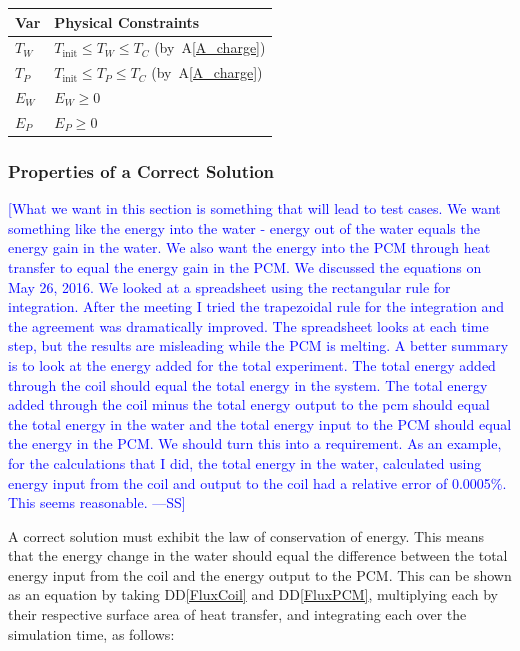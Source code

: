 \documentclass[12pt]{article}
\newcommand{\authornote}[3]{\textcolor{#1}{[#3 ---#2]}}
\newcommand{\authornote}[3]{}
\newcommand{\wss}[1]{\authornote{blue}{SS}{#1}}
\newcommand{\ddref}[1]{DD\ref{#1}}
\newcommand{\aref}[1]{A\ref{#1}}
\begin{document}
\begin{table}[!h]
\caption{Output Variables} \label{TblOutputVar}
\renewcommand{\arraystretch}{1.2}
\noindent \begin{longtable*}{l l} 
  \toprule
  \textbf{Var} & \textbf{Physical Constraints} \\
  \midrule 
  $T_W$ & $T_\text{init} \leq T_W \leq T_C$ (by~\aref{A_charge})
  \\
  $T_P$ & $T_\text{init} \leq T_P \leq T_C$ (by~\aref{A_charge})
  \\
  $E_W$ & $E_W \geq 0$
  \\
  $E_P$ & $E_P \geq 0$
  \\
  \bottomrule
\end{longtable*}
\end{table}

\subsubsection{Properties of a Correct Solution} \label{sec_CorrectSolution}

\wss{What we want in this section is something that will lead to test cases.  We
  want something like the energy into the water - energy out of the water equals
  the energy gain in the water.  We also want the energy into the PCM through
  heat transfer to equal the energy gain in the PCM.  We discussed the equations
  on May 26, 2016.  We looked at a spreadsheet using the rectangular rule for
  integration.  After the meeting I tried the trapezoidal rule for the
  integration and the agreement was dramatically improved.  The spreadsheet
  looks at each time step, but the results are misleading while the PCM is
  melting.  A better summary is to look at the energy added for the total
  experiment.  The total energy added through the coil should equal the total
  energy in the system.  The total energy added through the coil minus the total
  energy output to the pcm should equal the total energy in the water and the
  total energy input to the PCM should equal the energy in the PCM.  We should
  turn this into a requirement.  As an example, for the calculations that I did,
the total energy in the water, calculated using energy input from the coil and
output to the coil had a relative error of 0.0005\%.  This seems reasonable.}

\noindent
A correct solution must exhibit the law of conservation of energy.
This means that the energy change in the water should equal the
difference between the total energy input from the coil and the energy
output to the PCM. This can be shown as an equation by taking \ddref{FluxCoil}
and \ddref{FluxPCM}, multiplying each by their respective surface area of
heat transfer, and integrating each over the simulation time, as follows:
\end{document}

